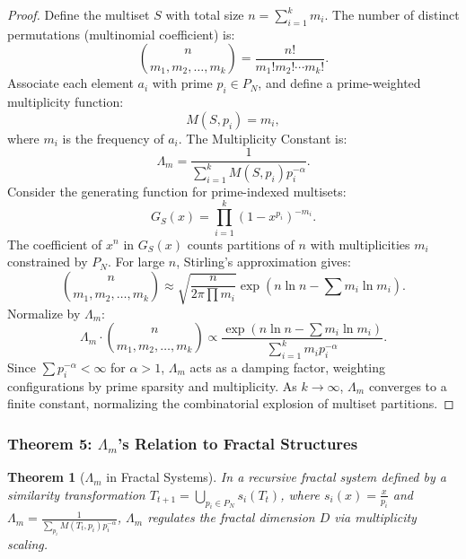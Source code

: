 \documentclass[12pt]{article}
\newtheorem{theorem}{Theorem}[section]
\begin{document}
\begin{proof}
Define the multiset \( S \) with total size \( n = \sum_{i=1}^k m_i \). The number of distinct permutations (multinomial coefficient) is:
\[
\binom{n}{m_1, m_2, \ldots, m_k} = \frac{n!}{m_1! m_2! \cdots m_k!}.
\]
Associate each element \( a_i \) with prime \( p_i \in P_N \), and define a prime-weighted multiplicity function:
\[
M(S, p_i) = m_i,
\]
where \( m_i \) is the frequency of \( a_i \). The Multiplicity Constant is:
\[
\Lambda_m = \frac{1}{\sum_{i=1}^k M(S, p_i) p_i^{-\alpha}}.
\]
Consider the generating function for prime-indexed multisets:
\[
G_S(x) = \prod_{i=1}^k \left( 1 - x^{p_i} \right)^{-m_i}.
\]
The coefficient of \( x^n \) in \( G_S(x) \) counts partitions of \( n \) with multiplicities \( m_i \) constrained by \( P_N \). For large \( n \), Stirling’s approximation gives:
\[
\binom{n}{m_1, m_2, \ldots, m_k} \approx \sqrt{\frac{n}{2\pi \prod m_i}} \exp\left( n \ln n - \sum m_i \ln m_i \right).
\]
Normalize by \(\Lambda_m\):
\[
\Lambda_m \cdot \binom{n}{m_1, m_2, \ldots, m_k} \propto \frac{\exp\left( n \ln n - \sum m_i \ln m_i \right)}{\sum_{i=1}^k m_i p_i^{-\alpha}}.
\]
Since \(\sum p_i^{-\alpha} < \infty\) for \(\alpha > 1\), \(\Lambda_m\) acts as a damping factor, weighting configurations by prime sparsity and multiplicity. As \( k \to \infty \), \(\Lambda_m\) converges to a finite constant, normalizing the combinatorial explosion of multiset partitions.
\end{proof}

\subsubsection{Theorem 5: \(\Lambda_m\)'s Relation to Fractal Structures}
\begin{theorem}[\(\Lambda_m\) in Fractal Systems]
In a recursive fractal system defined by a similarity transformation \( T_{t+1} = \bigcup_{p_i \in P_N} s_i(T_t) \), where \( s_i(x) = \frac{x}{p_i} \) and \(\Lambda_m = \frac{1}{\sum_{p_i} M(T_t, p_i) p_i^{-\alpha}}\), \(\Lambda_m\) regulates the fractal dimension \( D \) via multiplicity scaling.
\end{theorem}
\end{document}

